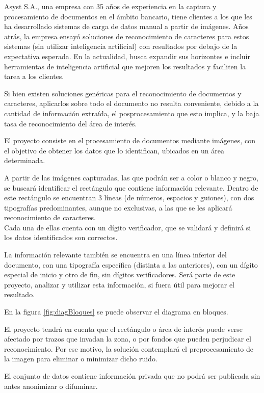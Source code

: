 \documentclass[
11pt, %
]{charter}
\begin{document}
Asyst S.A., una empresa con 35 años de experiencia en la captura y procesamiento de documentos en el ámbito bancario, tiene clientes a los que les ha desarrollado sistemas de carga de datos manual a partir de imágenes. Años atrás, la empresa ensayó soluciones de reconocimiento de caracteres para estos sistemas (sin utilizar inteligencia artificial) con resultados por debajo de la expectativa esperada. En la actualidad, busca expandir sus horizontes e incluir herramientas de inteligencia artificial que mejoren los resultados y faciliten la tarea a los clientes.


Si bien existen soluciones genéricas para el reconocimiento de documentos y caracteres, aplicarlos sobre todo el documento no resulta conveniente, debido a la cantidad de información extraída, el posprocesamiento que esto implica, y la baja tasa de reconocimiento del área de interés.

El proyecto consiste en el procesamiento de documentos mediante imágenes, con el objetivo de obtener los datos que lo identifican, ubicados en un área determinada. 

A partir de las imágenes capturadas, las que podrán ser a color o blanco y negro, se buscará identificar el rectángulo que contiene información relevante. Dentro de este rectángulo se encuentran 3 líneas (de números, espacios y guiones), con dos tipografías predominantes, aunque no exclusivas, a las que se les aplicará reconocimiento de caracteres.\\
Cada una de ellas cuenta con un dígito verificador, que se validará y definirá si los datos identificados son correctos.

La información relevante también se encuentra en una línea inferior del documento, con una tipografía específica (distinta a las anteriores), con un dígito especial de inicio y otro de fin, sin dígitos verificadores.
Será parte de este proyecto, analizar y utilizar esta información, si fuera útil para mejorar el resultado.

En la figura \ref{fig:diagBloques} se puede observar el diagrama en bloques.

El proyecto tendrá en cuenta que el rectángulo o área de interés puede verse afectado por trazos que invadan la zona, o por fondos que pueden perjudicar el reconocimiento. Por ese motivo, la solución contemplará el preprocesamiento de la imagen para eliminar o minimizar dicho ruido.

El conjunto de datos contiene información privada que no podrá ser publicada sin antes anonimizar o difuminar.
\end{document}
